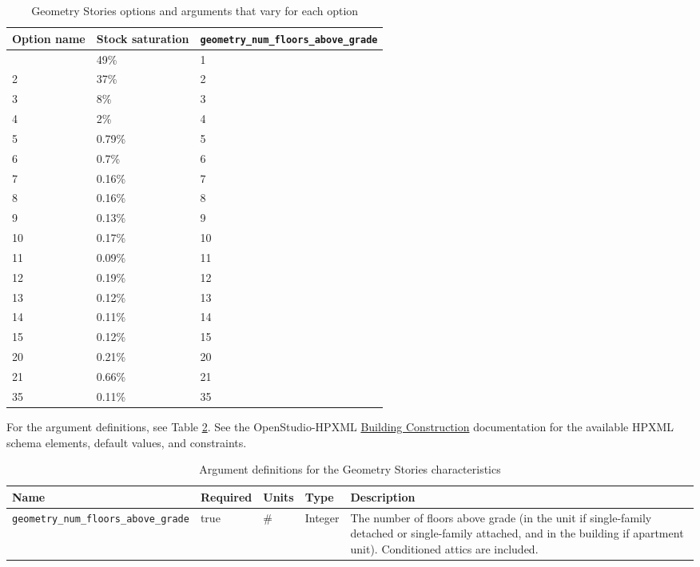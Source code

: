 \begin{longtable}[]{ |p{3cm}|p{3cm}|p{3cm}| }
\caption{Geometry Stories options and arguments that vary for each option} \label{table:hc_opt_geom_stories} \\
\toprule\noalign{}
Option name & Stock saturation &
\texttt{geometry\_num\_floors\_above\_grade} \\
\midrule\noalign{}
\endhead
\bottomrule\noalign{}
\endlastfoot
1 & 49\% & 1 \\ \hline
2 & 37\% & 2 \\ \hline
3 & 8\% & 3 \\ \hline
4 & 2\% & 4 \\ \hline
5 & 0.79\% & 5 \\ \hline
6 & 0.7\% & 6 \\ \hline
7 & 0.16\% & 7 \\ \hline
8 & 0.16\% & 8 \\ \hline
9 & 0.13\% & 9 \\ \hline
10 & 0.17\% & 10 \\ \hline
11 & 0.09\% & 11 \\ \hline
12 & 0.19\% & 12 \\ \hline
13 & 0.12\% & 13 \\ \hline
14 & 0.11\% & 14 \\ \hline
15 & 0.12\% & 15 \\ \hline
20 & 0.21\% & 20 \\ \hline
21 & 0.66\% & 21 \\ \hline
35 & 0.11\% & 35 \\ 
\end{longtable}

For the argument definitions, see Table \ref{table:hc_arg_def_geom_stories}. See the OpenStudio-HPXML \href{https://openstudio-hpxml.readthedocs.io/en/v1.8.1/workflow_inputs.html#hpxml-building-construction}{Building Construction} documentation for the available HPXML schema elements, default values, and constraints.

\begin{longtable}[]{ |p{}|p{1.5cm}|p{1.1cm}|p{1.4cm}|p{6cm}| }
\caption{Argument definitions for the Geometry Stories characteristics} \label{table:hc_arg_def_geom_stories}  \\
\toprule\noalign{}
Name & Required & Units & Type &  Description \\
\midrule\noalign{}
\endhead
\bottomrule\noalign{}
\endlastfoot
\texttt{geometry\_num\_floors\_above\_grade} & true & \# & Integer &
The number of floors above grade (in the unit if single-family detached
or single-family attached, and in the building if apartment unit).
Conditioned attics are included. \\
\end{longtable}

